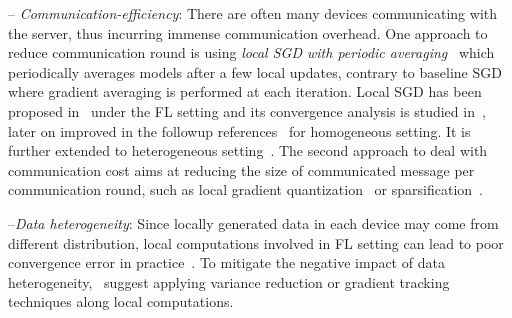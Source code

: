 \documentclass{article} %
\begin{document}
-- \emph{Communication-efficiency}: There are often many devices communicating with the server, thus incurring immense communication overhead. 
One approach to reduce communication round is using \emph{local SGD with periodic averaging}~\citep{zhou2018convergence,stich2019local,yu2019parallel,wang2018cooperative} which periodically averages models after a few local updates, contrary to baseline SGD~\citep{bottou-bousquet-2008} where gradient averaging is performed at each iteration.
Local SGD has been proposed in~\cite{mcmahan2016communication,konevcny2016federated} under the FL setting and its convergence analysis is studied in~\cite{stich2019local,wang2018cooperative,zhou2018convergence,yu2019parallel}, later on improved in the followup references~\citep{basu2019qsparse,haddadpour2019convergence,bayoumi2020tighter,stich2019error} for homogeneous setting. 
It is further extended to heterogeneous setting~\citep{haddadpour2019convergence,karimireddy2019scaffold,yu2019linear,li2019convergence,sahu2018convergence,liang2019variance}. The second approach to deal with communication cost aims at reducing the size of communicated message per communication round, such as local gradient quantization~\citep{alistarh2017qsgd,bernstein2018signsgd,tang2018communication,wen2017terngrad,wu2018error} or sparsification~\citep{alistarh2018convergence,lin2017deep,stich2018sparsified,stich2019error}. 


--\emph{Data heterogeneity}: 
Since locally generated data in each device may come from different distribution, local computations involved in FL setting can lead to poor convergence error in practice~\citep{li2019federated,liang2019variance}. 
To mitigate the negative impact of data heterogeneity,~\citep{haddadpour2020federated,horvath2019stochastic,liang2019variance,karimireddy2019scaffold} suggest applying variance reduction or gradient tracking techniques along local computations.
\end{document}
